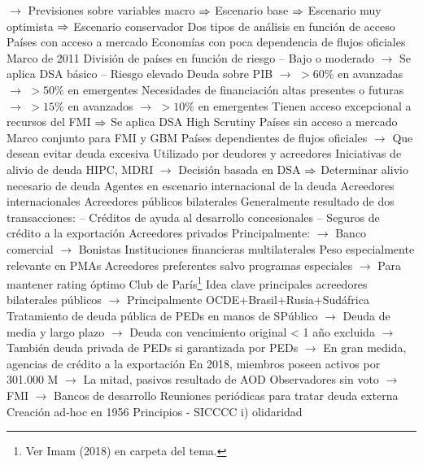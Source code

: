 \documentclass{nuevotema}
\begin{document}
\begin{esquemal}
				\4[] $\to$ Previsiones sobre variables macro
				\4[] $\Rightarrow$ Escenario base
				\4[] $\Rightarrow$ Escenario muy optimista
				\4[] $\Rightarrow$ Escenario conservador
				\4[] Dos tipos de análisis en función de acceso
				\4 Países con acceso a mercado
				\4[] Economías con poca dependencia de flujos oficiales
				\4[] Marco de 2011
				\4[] División de países en función de riesgo
				\4[] -- Bajo o moderado
				\4[] $\to$ Se aplica DSA básico
				\4[] -- Riesgo elevado
				\4[] Deuda sobre PIB
				\4[] $\to$ $>60\%$ en avanzadas
				\4[] $\to$ $>50\%$ en emergentes
				\4[] Necesidades de financiación altas presentes o futuras
				\4[] $\to$ $>15\%$ en avanzados
				\4[] $\to$ $>10\%$ en emergentes
				\4[] Tienen acceso excepcional a recursos del FMI
				\4[] $\Rightarrow$ Se aplica DSA High Scrutiny
				\4 Países sin acceso a mercado
				\4[] Marco conjunto para FMI y GBM
				\4[] Países dependientes de flujos oficiales
				\4[] $\to$ Que desean evitar deuda excesiva
				\4[] Utilizado por deudores y acreedores
				\4[] Iniciativas de alivio de deuda HIPC, MDRI
				\4[] $\to$ Decisión basada en DSA
				\4[] $\Rightarrow$ Determinar alivio necesario de deuda
		\2 Agentes en escenario internacional de la deuda
			\3 Acreedores internacionales
				\4 Acreedores públicos bilaterales
				\4[] Generalmente resultado de dos transacciones:
				\4[] -- Créditos de ayuda al desarrollo concesionales
				\4[] -- Seguros de crédito a la exportación
				\4 Acreedores privados
				\4[] Principalmente:
				\4[] $\to$ Banco comercial
				\4[] $\to$ Bonistas
				\4 Instituciones financieras multilaterales
				\4[] Peso especialmente relevante en PMAs
				\4[] Acreedores preferentes salvo programas especiales
				\4[] $\to$ Para mantener rating óptimo
			\3 Club de París\footnote{Ver Imam (2018) en carpeta del tema.}
				\4 Idea clave
				 principales acreedores bilaterales públicos
				\4[] $\to$ Principalmente OCDE+Brasil+Rusia+Sudáfrica
				\4[] Tratamiento de deuda pública de PEDs en manos de SPúblico
				\4[] $\to$ Deuda de media y largo plazo
				\4[] $\to$ Deuda con vencimiento original < 1 año excluida
				\4[] $\to$ También deuda privada de PEDs si garantizada por PEDs
				\4[] $\to$ En gran medida, agencias de crédito a la exportación
				\4[] En 2018, miembros poseen activos por 301.000 M
				\4[] $\to$ La mitad, pasivos resultado de AOD
				\4[] Observadores sin voto
				\4[] $\to$ FMI
				\4[] $\to$ Bancos de desarrollo
				\4[] Reuniones periódicas para tratar deuda externa
				\4[] Creación ad-hoc en 1956
				\4 Principios - SICCCC
				\4[] i) olidaridad

\end{esquemal}
\end{document}

